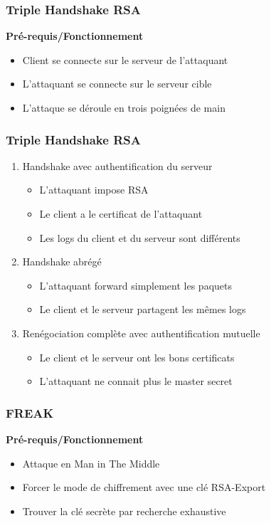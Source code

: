 \begin{frame}
  \frametitle{Triple Handshake RSA}
  \textbf{Pré-requis/Fonctionnement}
  \begin{itemize}
  \item Client se connecte sur le serveur de l'attaquant
  \item L'attaquant se connecte sur le serveur cible
  \item L'attaque se déroule en trois poignées de main
\end{itemize}
\end{frame}

\begin{frame}
  \frametitle{Triple Handshake RSA}
    \begin{enumerate}
    \item Handshake avec authentification du serveur
      \begin{itemize}
      \item L'attaquant impose RSA
      \item Le client a le certificat de l'attaquant
      \item Les logs du client et du serveur sont différents
      \end{itemize}
      \pause
    \item Handshake abrégé
      \begin{itemize}
      \item L'attaquant forward simplement les paquets
      \item Le client et le serveur partagent les mêmes logs
      \end{itemize}
      \pause
    \item Renégociation complète avec authentification mutuelle
      \begin{itemize}
      \item Le client et le serveur ont les bons certificats
      \item L'attaquant ne connait plus le master secret
      \end{itemize}
    \end{enumerate}

\end{frame}

\begin{frame}
  \frametitle{FREAK}
  \textbf{Pré-requis/Fonctionnement}
  \begin{itemize}
  \item Attaque en Man in The Middle
  \item Forcer le mode de chiffrement avec une clé RSA-Export
  \item Trouver la clé secrète par recherche exhaustive
  \end{itemize}
\end{frame}

